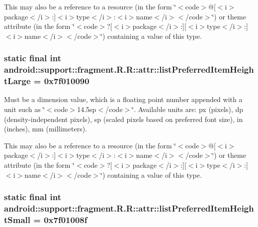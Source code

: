 This may also be a reference to a resource (in the form \char`\"{}$<$code$>$@\mbox{[}$<$i$>$package$<$/i$>$:\mbox{]}$<$i$>$type$<$/i$>$:$<$i$>$name$<$/i$>$$<$/code$>$\char`\"{}) or theme attribute (in the form \char`\"{}$<$code$>$?\mbox{[}$<$i$>$package$<$/i$>$:\mbox{]}\mbox{[}$<$i$>$type$<$/i$>$:\mbox{]}$<$i$>$name$<$/i$>$$<$/code$>$\char`\"{}) containing a value of this type. \hypertarget{classandroid_1_1support_1_1fragment_1_1_r_1_1attr_8ef4c426ad32448cf7d0bb4d173526c6}{
\subsubsection[{listPreferredItemHeightLarge}]{\setlength{\rightskip}{0pt plus 5cm}static final int android::support::fragment.R.R::attr::listPreferredItemHeightLarge = 0x7f010090}}
\label{classandroid_1_1support_1_1fragment_1_1_r_1_1attr_8ef4c426ad32448cf7d0bb4d173526c6}


Must be a dimension value, which is a floating point number appended with a unit such as \char`\"{}$<$code$>$14.5sp$<$/code$>$\char`\"{}. Available units are: px (pixels), dp (density-independent pixels), sp (scaled pixels based on preferred font size), in (inches), mm (millimeters). 

This may also be a reference to a resource (in the form \char`\"{}$<$code$>$@\mbox{[}$<$i$>$package$<$/i$>$:\mbox{]}$<$i$>$type$<$/i$>$:$<$i$>$name$<$/i$>$$<$/code$>$\char`\"{}) or theme attribute (in the form \char`\"{}$<$code$>$?\mbox{[}$<$i$>$package$<$/i$>$:\mbox{]}\mbox{[}$<$i$>$type$<$/i$>$:\mbox{]}$<$i$>$name$<$/i$>$$<$/code$>$\char`\"{}) containing a value of this type. \hypertarget{classandroid_1_1support_1_1fragment_1_1_r_1_1attr_0aeafeed3bc676567b13d1f720337ea4}{
\subsubsection[{listPreferredItemHeightSmall}]{\setlength{\rightskip}{0pt plus 5cm}static final int android::support::fragment.R.R::attr::listPreferredItemHeightSmall = 0x7f01008f}}
\label{classandroid_1_1support_1_1fragment_1_1_r_1_1attr_0aeafeed3bc676567b13d1f720337ea4}


